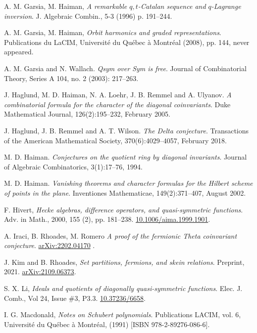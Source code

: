 \documentclass[submission]{FPSAC2023}
\theoremstyle{definition}
\numberwithin{equation}{section}
\begin{document}
\begin{thebibliography}{999}
 A. M. Garsia, M. Haiman,
\textit {A remarkable {$q,t$}-{C}atalan sequence and {$q$}-{L}agrange inversion}.
J. Algebraic Combin., 5-3 (1996) p. 191--244.

 A. M. Garsia, M. Haiman,
\textit{Orbit harmonics and graded representations}.
Publications du LaCIM, Universit\'e du Qu\'ebec \`a Montr\'eal (2008), pp. 144,
never appeared.

 A. M. Garsia and N. Wallach.
\textit{Qsym over Sym is free}.
Journal of Combinatorial Theory, Series A 104, no. 2 (2003): 217--263.

 J. Haglund, M. D. Haiman, N. A. Loehr, J. B. Remmel and A. Ulyanov.
\textit{A combinatorial formula for the character of the diagonal coinvariants}.
Duke Mathematical Journal, 126(2):195--232, February 2005.

 J. Haglund, J. B. Remmel and A. T. Wilson.
\textit{The Delta conjecture}.
Transactions of the American Mathematical Society, 370(6):4029--4057, February 2018.

 M. D. Haiman.
\textit{Conjectures on the quotient ring by diagonal invariants}.
Journal of Algebraic Combinatorics, 3(1):17--76, 1994.

 M. D. Haiman.
\textit{Vanishing theorems and character formulas for the Hilbert scheme of points in the plane}.
Inventiones Mathematicae, 149(2):371--407, August 2002.

 F. Hivert,
\textit{Hecke algebras, difference operators, and quasi-symmetric functions}.
Adv. in Math., 2000, 155 (2), pp. 181--238.
\href{https://doi-org/10.1006/aima.1999.1901}{10.1006/aima.1999.1901}.

 A. Iraci, B. Rhoades, M. Romero
\textit{A proof of the fermionic Theta coinvariant conjecture}.
\href{https://arxiv.org/abs/2202.04170}{arXiv:2202.04170} .

 J. Kim and B. Rhoades,
\textit{Set partitions, fermions, and skein relations}. Preprint, 2021.
\href{https://arxiv.org/abs/2109.06373}{arXiv:2109.06373}.

 S. X. Li,
\textit{Ideals and quotients of diagonally quasi-symmetric functions}.
Elec. J. Comb., Vol 24, Issue \#3, P3.3.
\href{https://doi.org/10.37236/6658}{10.37236/6658}.

 I. G. Macdonald,
\textit{Notes on Schubert polynomials}.
Publications LACIM, vol. 6, Universit\'e du Qu\'ebec \`a Montr\'eal,  (1991) [ISBN 978-2-89276-086-6].


\end{thebibliography}
\end{document}
